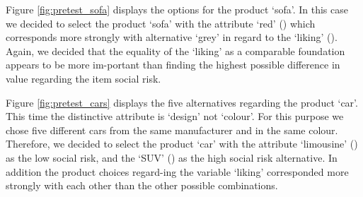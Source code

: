 Figure \ref{fig:pretest_sofa} displays the options for the product ‘sofa’. In this case we decided to select the product ‘sofa’ with the attribute ‘red’ () which corresponds more strongly with alternative ‘grey’ in regard to the ‘liking’ (). Again, we decided that the equality of the ‘liking’ as a comparable foundation appears to be more im-portant than finding the highest possible difference in value regarding the item social risk. \par
Figure \ref{fig:pretest_cars} displays the five alternatives regarding the product ‘car’. This time the distinctive attribute is ‘design’ not ‘colour’. For this purpose we chose five different cars from the same manufacturer and in the same colour. Therefore, we decided to select the product ‘car’ with the attribute ‘limousine’ () as the low social risk, and the ‘SUV’ () as the high social risk alternative. In addition the product choices regard-ing the variable ‘liking’ corresponded more strongly with each other than the other possible combinations.\par
